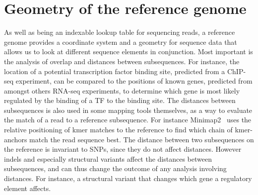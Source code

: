 \section{Geometry of the reference genome}
As well as being an indexable lookup table for sequencing reads, a reference genome provides a coordinate system and a geometry for sequence data that allows us to look at different sequence elements in conjunction. 
Most important is the analysis of overlap and distances between subsequences. For instance, the location of a  potential transcription factor binding site, predicted from a ChIP-seq experiment, can be compared to the positions of known genes, predicted from amongst others RNA-seq experiments, to determine which gene is most likely regulated by the binding of a TF to the binding site. The distances between subsequences is also used in some mapping tools themselves, as a way to evaluate the match of a read to a reference subsequence.
For instance Minimap2~\cite{minimap2} uses the relative positioning of kmer matches to the reference to find which chain of kmer-anchors match the read sequence best. The distance between two subsequences on the reference is invariant to SNPs, since they do not affect distances. However indels and especially structural variants affect the distances between subsequences, and can thus change the outcome of any analysis involving distances. For instance, a structural variant that changes which gene a regulatory element affects. 


